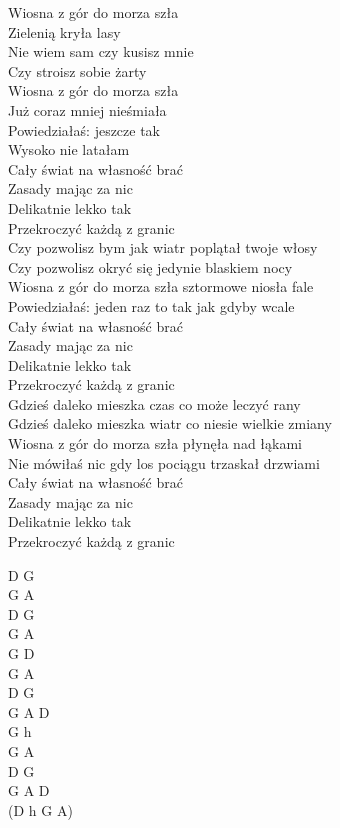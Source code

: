 \begin{text}
    Wiosna z gór do morza szła\\
    Zielenią kryła lasy\\
    Nie wiem sam czy kusisz mnie\\
    Czy stroisz sobie żarty\\
    Wiosna z gór do morza szła\\
    Już coraz mniej nieśmiała\\
    Powiedziałaś: jeszcze tak\\
    Wysoko nie latałam\\
    \vin Cały świat na własność brać\\
    \vin Zasady mając za nic\\
    \vin Delikatnie lekko tak\\
    \vin Przekroczyć każdą z granic\\

    Czy pozwolisz bym jak wiatr poplątał twoje włosy\\
    Czy pozwolisz okryć się jedynie blaskiem nocy\\
    Wiosna z gór do morza szła sztormowe niosła fale\\
    Powiedziałaś: jeden raz to tak jak gdyby wcale\\
    \vin Cały świat na własność brać\\
    \vin Zasady mając za nic\\
    \vin Delikatnie lekko tak\\
    \vin Przekroczyć każdą z granic\\

    Gdzieś daleko mieszka czas co może leczyć rany\\
    Gdzieś daleko mieszka wiatr co niesie wielkie zmiany\\
    Wiosna z gór do morza szła płynęła nad łąkami\\
    Nie mówiłaś nic gdy los pociągu trzaskał drzwiami\\
    \vin Cały świat na własność brać\\
    \vin Zasady mając za nic\\
    \vin Delikatnie lekko tak\\
    \vin Przekroczyć każdą z granic\\
\end{text}
\begin{chord}
    D G\\
    G A\\
    D G\\
    G A\\
    G D\\
    G A\\
    D G\\
    G A D\\
    G h\\
    G A\\
    D G\\
    G A D\\
    (D h G A)
\end{chord}